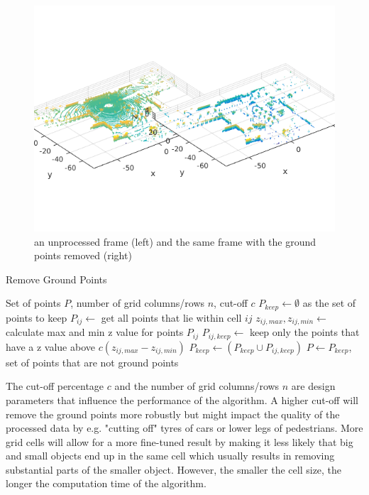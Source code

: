 \begin{figure}[H]
\centering
\includegraphics[width = \textwidth]{include/images/ground_remove.png}
\caption{an unprocessed frame (left) and the same frame with the ground points removed (right)}
\label{fig:ground_removal}
\end{figure}

\begin{algorithm}[H]
\caption{Remove Ground Points}\label{ground_point}
\begin{algorithmic}
\Input Set of points $P$, number of grid columns/rows $n$, cut-off $c$
\Init $P_{keep} \leftarrow \emptyset$ as the set of points to keep   
\State $P_{ij} \leftarrow$ get all points that lie within cell $ij$
\State $z_{ij,max}, z_{ij,min} \leftarrow$ calculate max and min z value for points $P_{ij}$
\State $P_{ij,keep} \leftarrow$ keep only the points that have a z value above $c (z_{ij,max} - z_{ij,min})$
\State $P_{keep} \leftarrow (P_{keep} \cup P_{ij,keep})$  
\EndFor
\EndFor
\Output $P \leftarrow P_{keep}$, set of points that are not ground points
\end{algorithmic}
\end{algorithm}

The cut-off percentage $c$ and the number of grid columns/rows $n$ are design parameters that influence the performance of the algorithm. A higher cut-off will remove the ground points more robustly but might impact the quality of the processed data by e.g. "cutting off" tyres of cars or lower legs of pedestrians. More grid cells will allow for a more fine-tuned result by making it less likely that big and small objects end up in the same cell which usually results in removing substantial parts of the smaller object. However, the smaller the cell size, the longer the computation time of the algorithm.

